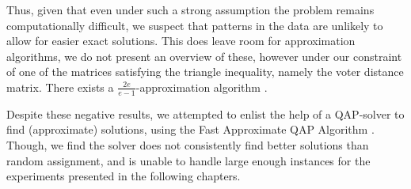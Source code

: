 Thus, given that even under such a strong assumption the problem remains
computationally difficult, we suspect that patterns in the data are unlikely to
allow for easier exact solutions. This does leave room for approximation
algorithms, we do not present an overview of these, however under our
constraint of one of the matrices satisfying the triangle inequality, namely
the voter distance matrix. There exists a $\frac{2e}{e-1}$-approximation
algorithm \cite{nagarajanMaximumQuadraticAssignment}.

Despite these negative results, we attempted to enlist the help of a QAP-solver
\cite{virtanenSciPy10Fundamental2020} to find (approximate) solutions, using
the Fast Approximate QAP Algorithm
\cite{vogelsteinFastApproximateQuadratic2015}. Though, we find the solver does
not consistently find better solutions than random assignment, and is unable to
handle large enough instances for the experiments presented in the following
chapters.

